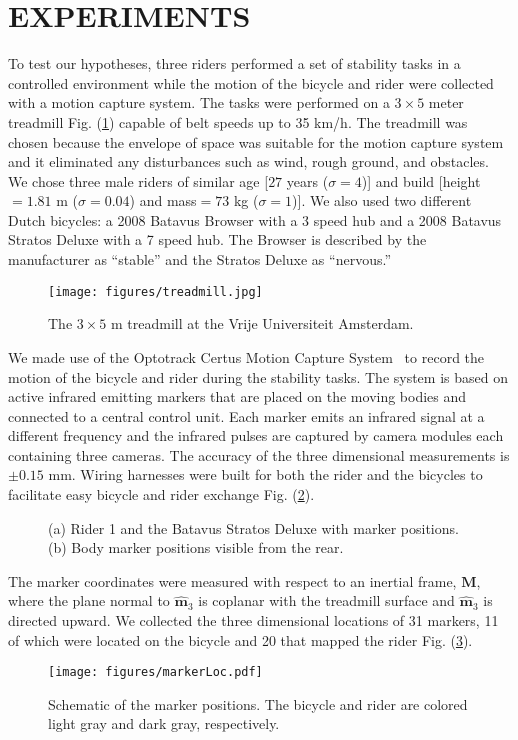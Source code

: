 \section{EXPERIMENTS}
\label{sec:exp}
To test our hypotheses, three riders performed a set of stability tasks in a
controlled environment while the motion of the bicycle and rider were collected
with a motion capture system. The tasks were performed on a $3\times5$ meter
treadmill Fig. (\ref{fig:treadmill}) capable of belt speeds up to 35 km/h. The
treadmill was chosen because the envelope of space was suitable for the motion
capture system and it eliminated any disturbances such as wind, rough ground,
and obstacles.  We chose three male riders of similar age [$27$ years
($\sigma=4$)] and build [height$=1.81$ m ($\sigma=0.04$) and mass$=73$ kg
($\sigma=1$)]. We also used two different Dutch bicycles: a 2008 Batavus
Browser with a 3 speed hub and a 2008 Batavus Stratos Deluxe with a 7 speed
hub. The Browser is described by the manufacturer as ``stable'' and the Stratos
Deluxe as ``nervous.''
\begin{figure}
    \centering
        \texttt{[image: figures/treadmill.jpg]}
    \caption{The $3\times5$ m treadmill at the Vrije Universiteit Amsterdam.}
    \label{fig:treadmill}
\end{figure}

We made use of the Optotrack Certus Motion Capture
System~\cite{NorthernDigitalIncorporated2009} to record the motion of the
bicycle and rider during the stability tasks. The system is based on active
infrared emitting markers that are placed on the moving bodies and connected to
a central control unit. Each marker emits an infrared signal at a different
frequency and the infrared pulses are captured by camera modules each
containing three cameras. The accuracy of the three dimensional measurements is
$\pm0.15$ mm. Wiring harnesses were built for both the rider and the bicycles
to facilitate easy bicycle and rider exchange Fig. (\ref{fig:markers}).
\begin{figure}
    \centering
    \caption{(a) Rider 1 and the Batavus Stratos Deluxe with marker positions. (b) Body marker positions visible from the rear.}
    \label{fig:markers}
\end{figure}

The marker coordinates were measured with respect to an inertial frame,
$\mathbf{M}$, where the plane normal to $\hat{\mathbf{m}}_3$ is coplanar with
the treadmill surface and $\hat{\mathbf{m}}_3$ is directed upward. We collected
the three dimensional locations of 31 markers, 11 of which were located on the
bicycle and 20 that mapped the rider Fig. (\ref{fig:markerloc}).
\begin{figure}
    \centering
        \texttt{[image: figures/markerLoc.pdf]}
    \caption{Schematic of the marker positions. The bicycle and rider are colored light gray and dark gray, respectively.}
    \label{fig:markerloc}
\end{figure}

